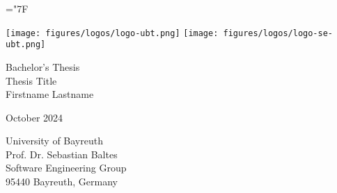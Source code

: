 \documentclass[
  pdftex,            %
  12pt,              %
  a4paper,           %
  parskip=relative,  %
  twoside,           %
  footinclude=false, %
  footheight=0mm,    %
  toc=bibliography,  %
  toc=listof         %
]{scrbook}           %
\theoremstyle{definitiontight}
\newcommand{\thesistype}{Bachelor's Thesis} %
\newcommand{\thesistitle}{Thesis Title}
\newcommand{\studentname}{Firstname Lastname}
\newcommand{\monthyear}{October 2024}
\begin{document}
\hyphenchar\font=\string"7F 


\frontmatter

\begin{titlepage}

	\begin{center}
		\texttt{[image: figures/logos/logo-ubt.png]}	
		\hfill
		\texttt{[image: figures/logos/logo-se-ubt.png]}	
	\end{center}
	
	\vspace{4cm}
	
	\begin{center}
		{\large \thesistype}\\
		\vspace{0.5cm}
		{\LARGE\textsf{\thesistitle}}\\
		\vspace{1cm}
		{\large \studentname}\\
	\end{center}

	\vfill
		
	\begin{center}
		{\large \monthyear}
	\end{center}

\end{titlepage}

\newpage
\thispagestyle{empty}
\mbox{}
\newpage




\thispagestyle{empty}
	
\begin{center}
	{\large University of Bayreuth}\\
	\vspace{5pt}
	Prof. Dr. Sebastian Baltes\\
	Software Engineering Group\\
	95440 Bayreuth, Germany\\
\end{center}
	
\vspace{1pt}
	
\end{document}
